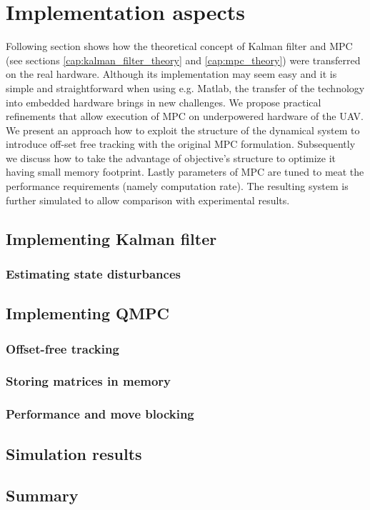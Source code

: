 \section{Implementation aspects}
\label{cap:Implementation}

Following section shows how the theoretical concept of Kalman filter and MPC (see sections \ref{cap:kalman_filter_theory} and \ref{cap:mpc_theory}) were transferred on the real hardware. Although its implementation may seem easy and it is simple and straightforward when using e.g. Matlab, the transfer of the technology into embedded hardware brings in new challenges. We propose practical refinements that allow execution of MPC on underpowered hardware of the UAV. We present an approach how to exploit the structure of the dynamical system to introduce off-set free tracking with the original MPC formulation. Subsequently we discuss how to take the advantage of objective's structure to optimize it having small memory footprint. Lastly parameters of MPC are tuned to meat the performance requirements (namely computation rate). The resulting system is further simulated to allow comparison with experimental results.



\subsection{Implementing Kalman filter}



\subsubsection{Estimating state disturbances}

\subsection{Implementing QMPC}

\subsubsection{Offset-free tracking}

\subsubsection{Storing matrices in memory}

\subsubsection{Performance and move blocking}
\label{cap:implementation_performance}

\subsection{Simulation results}

\subsection{Summary}